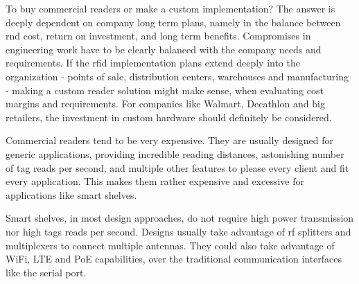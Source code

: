 To buy commercial readers or make a custom implementation?
The answer is deeply dependent on company long term plans, namely in the balance between \ac{rnd} cost, return on investment, and long term benefits. Compromises in engineering work have to be clearly balanced with the company needs and requirements. If the \ac{rfid} implementation plans extend deeply into the organization - points of sale, distribution centers, warehouses and manufacturing - making a custom reader solution might make sense, when evaluating cost margins and requirements. For companies like Walmart, Decathlon and big retailers, the investment in custom hardware should definitely be considered.

Commercial readers tend to be very expensive. They are usually designed for generic applications, providing incredible reading distances, astonishing number of tag reads per second, and multiple other features to please every client and fit every application.
This makes them rather expensive and excessive for applications like smart shelves.

Smart shelves, in most design approaches, do not require high power transmission nor high tags reads per second. Designs usually take advantage of \ac{rf} splitters and multiplexers to connect multiple antennas. They could also take advantage of WiFi, LTE and PoE capabilities, over the traditional communication interfaces like the serial port.

